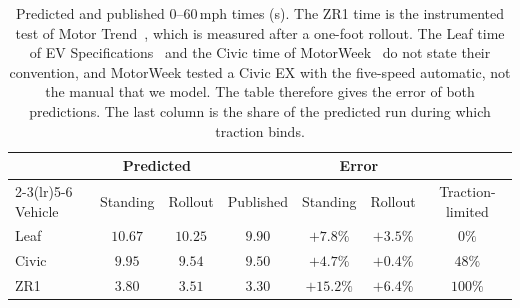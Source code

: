 \begin{table}[htbp]
\centering\small
\setlength{\tabcolsep}{4pt}
\caption{Predicted and published $0$--$60$\,mph times (s). The ZR1 time is the instrumented test of Motor Trend~\cite{MotorTrendZR1}, which is measured after a one-foot rollout. The Leaf time of EV Specifications~\cite{Leaf2013} and the Civic time of MotorWeek~\cite{Civic2013} do not state their convention, and MotorWeek tested a Civic EX with the five-speed automatic, not the manual that we model. The table therefore gives the error of both predictions. The last column is the share of the predicted run during which traction binds.}\label{tab:app-060}
\begin{tabular}{lcccccc}
\toprule
& \multicolumn{2}{c}{Predicted} & & \multicolumn{2}{c}{Error} & \\
\cmidrule(lr){2-3}\cmidrule(lr){5-6}
Vehicle & Standing & Rollout & Published & Standing & Rollout & Traction-limited\\
\midrule
Leaf & $10.67$ & $10.25$ & $9.90$ & $+7.8\%$ & $+3.5\%$ & $0\%$\\
Civic & $9.95$ & $9.54$ & $9.50$ & $+4.7\%$ & $+0.4\%$ & $48\%$\\
ZR1 & $3.80$ & $3.51$ & $3.30$ & $+15.2\%$ & $+6.4\%$ & $100\%$\\
\bottomrule
\end{tabular}
\end{table}
